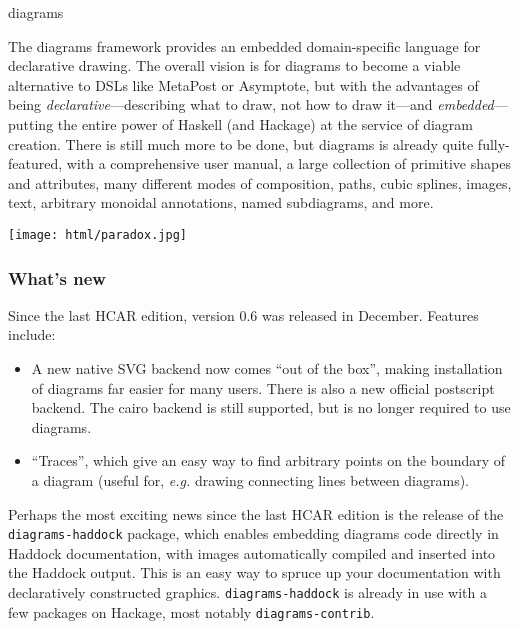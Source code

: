\begin{hcarentry}[updated]{diagrams}
\makeheader

The diagrams framework provides an embedded domain-specific language
for declarative drawing.  The overall vision is for diagrams to become
a viable alternative to DSLs like MetaPost or Asymptote, but with the
advantages of being \emph{declarative}---describing what to draw, not
how to draw it---and \emph{embedded}---putting the entire power of
Haskell (and Hackage) at the service of diagram creation.  There is
still much more to be done, but diagrams is already quite
fully-featured, with a comprehensive user manual, a large collection
of primitive shapes and attributes, many different modes of
composition, paths, cubic splines, images, text, arbitrary monoidal
annotations, named subdiagrams, and more.

\begin{center}
\texttt{[image: html/paradox.jpg]}
\end{center}

\subsubsection*{What's new}

Since the last HCAR edition, version 0.6 was released in December.
Features include:
\begin{itemize}
\item A new native SVG backend now comes ``out of the box'', making
  installation of diagrams far easier for many users.  There is also a
  new official postscript backend.  The cairo backend is still
  supported, but is no longer required to use diagrams.
\item ``Traces'', which give an easy way to find arbitrary points on
  the boundary of a diagram (useful for, \emph{e.g.} drawing
  connecting lines between diagrams).
\end{itemize}

Perhaps the most exciting news since the last HCAR edition is the
release of the \texttt{diagrams-haddock} package, which enables
embedding diagrams code directly in Haddock documentation, with images
automatically compiled and inserted into the Haddock output.  This is
an easy way to spruce up your documentation with declaratively
constructed graphics.  \texttt{diagrams-haddock} is already in use
with a few packages on Hackage, most notably \texttt{diagrams-contrib}.


\end{hcarentry}
